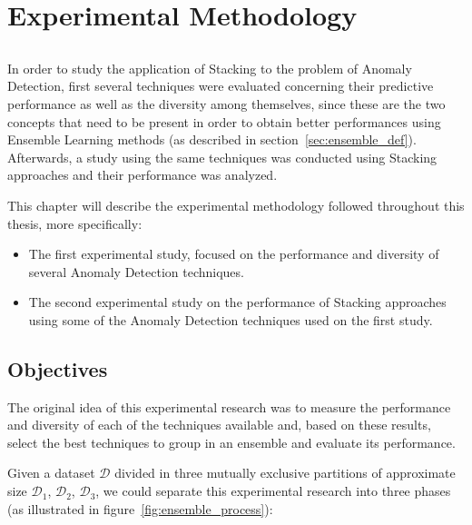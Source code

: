 \chapter{Experimental Methodology} \label{chap:meth}

\section*{}

In order to study the application of Stacking to the problem of Anomaly Detection, first several techniques were evaluated concerning their predictive performance as well as the diversity among themselves, since these are the two concepts that need to be present in order to obtain better performances using Ensemble Learning methods (as described in section~\ref{sec:ensemble_def}).
Afterwards, a study using the same techniques was conducted using Stacking approaches and their performance was analyzed.

This chapter will describe the experimental methodology followed throughout this thesis, more specifically:

\begin{itemize}
	\item The first experimental study, focused on the performance and diversity of several Anomaly Detection techniques.
	\item The second experimental study on the performance of Stacking approaches using some of the Anomaly Detection techniques used on the first study.
\end{itemize}

\section{Objectives}

The original idea of this experimental research was to measure the performance and diversity of each of the techniques available and, based on these results, select the best techniques to group in an ensemble and evaluate its performance.

Given a dataset $\mathcal{D}$ divided in three mutually exclusive partitions of approximate size $\mathcal{D}_1$, $\mathcal{D}_2$, $\mathcal{D}_3$, we could separate this experimental research into three phases (as illustrated in figure~\ref{fig:ensemble_process}):

